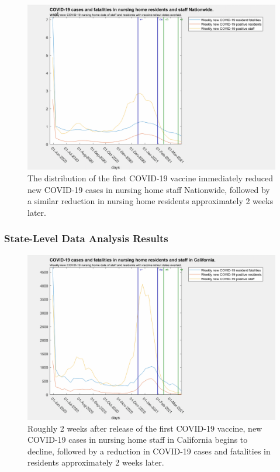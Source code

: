 \documentclass[twoside]{article}
\begin{document}
\begin{multicols}{2}
\begin{figure}[H]
	\includegraphics[width=\linewidth]{images/nationwide_nursing_home_with_vaccine.png}
	\caption{The distribution of the first COVID-19 vaccine immediately reduced new COVID-19 cases in nursing home staff Nationwide, followed by a similar reduction in nursing home residents approximately 2 weeks later.  }
	\label{fig:images/nationwide_nursing_home_with_vaccineLabel}
\end{figure}

\subsubsection{State-Level Data Analysis Results}

\begin{figure}[H]
	\includegraphics[width=\linewidth]{images/california_nursing_home_with_vaccine.png}
	\caption{Roughly 2 weeks after release of the first COVID-19 vaccine, new COVID-19 cases in nursing home staff in California begins to decline, followed by a reduction in COVID-19 cases and fatalities in residents approximately 2 weeks later. }
	\label{fig:images/california_nursing_home_with_vaccineLabel}
\end{figure}


\end{multicols}
\end{document}
